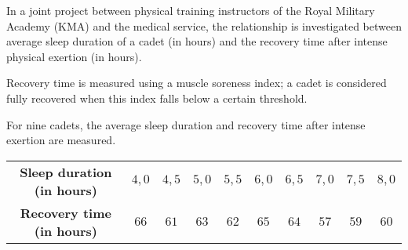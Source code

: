 \begin{question}{22}{
    In a joint project between physical training instructors of the Royal Military Academy (KMA) and the medical service, the relationship is investigated
    between average sleep duration of a cadet (in hours) and the recovery time after intense physical exertion (in hours).
    
    Recovery time is measured using a muscle soreness index; a cadet is considered fully recovered when this index falls below a certain threshold.

    For nine cadets, the average sleep duration and recovery time after intense exertion are measured.
    \begin{center}
        \begin{tabular}{c|ccccccccc}
            \toprule
                \textbf{Sleep duration (in hours)} & $4,0$ & $4,5$ & $5,0$ & $5,5$ & $6,0$ & $6,5$ & $7,0$ & $7,5$ & $8,0$ \\
                \textbf{Recovery time (in hours)} & $66$ & $61$ & $63$ & $62$ & $65$ & $64$ & $57$ & $59$ & $60$ \\
            \bottomrule
        \end{tabular}
    \end{center}
}
    


\end{question}
